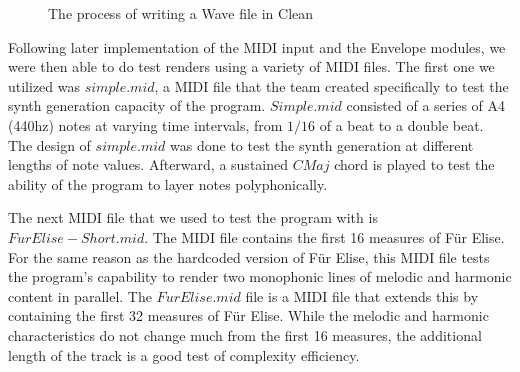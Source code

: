 \documentclass[runningheads]{llncs}
\begin{document}
\begin{figure}[H]
\centering
{}
\caption{The process of writing a Wave file in Clean}
\label{fig:writefile}
\end{figure}

Following later implementation of the MIDI input and the Envelope modules, we were then able to do test renders using a variety of MIDI files. The first one we utilized was $simple.mid$, a MIDI file that the team created specifically to test the synth generation capacity of the program. $Simple.mid$ consisted of a series of A4 (440hz) notes at varying time intervals, from $1/16$ of a beat to a double beat. The design of $simple.mid$ was done to test the synth generation at different lengths of note values. Afterward, a sustained $CMaj$ chord is played to test the ability of the program to layer notes polyphonically.

The next MIDI file that we used to test the program with is $FurElise-Short.mid$. The MIDI file contains the first 16 measures of F\"ur Elise. For the same reason as the hardcoded version of F\"ur Elise, this MIDI file tests the program's capability to render two monophonic lines of melodic and harmonic content in parallel. The $FurElise.mid$ file is a MIDI file that extends this by containing the first 32 measures of F\"ur Elise. While the melodic and harmonic characteristics do not change much from the first 16 measures, the additional length of the track is a good test of complexity efficiency.
\end{document}
